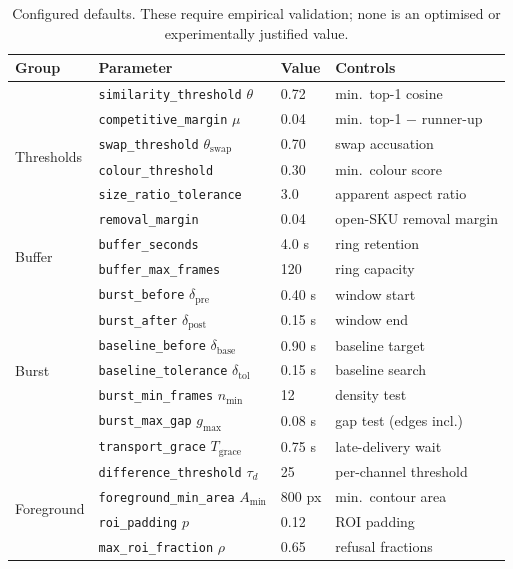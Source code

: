 \documentclass[conference]{IEEEtran}
\begin{document}
\begin{table}[!t]
\caption{Configured defaults. These require empirical validation; none is an optimised or
experimentally justified value.}
\label{tab:params}
\centering
\footnotesize
\renewcommand{\arraystretch}{1.1}
\begin{tabular}{@{}llll@{}}
\toprule
Group & Parameter & Value & Controls \\
\midrule
\multirow{6}{*}{Thresholds}
 & \texttt{similarity\_threshold} $\theta$ & 0.72 & min.\ top-1 cosine \\
 & \texttt{competitive\_margin} $\mu$ & 0.04 & min.\ top-1 $-$ runner-up \\
 & \texttt{swap\_threshold} $\theta_{\mathrm{swap}}$ & 0.70 & swap accusation \\
 & \texttt{colour\_threshold} & 0.30 & min.\ colour score \\
 & \texttt{size\_ratio\_tolerance} & 3.0 & apparent aspect ratio \\
 & \texttt{removal\_margin} & 0.04 & open-SKU removal margin \\
\midrule
\multirow{2}{*}{Buffer}
 & \texttt{buffer\_seconds} & 4.0 s & ring retention \\
 & \texttt{buffer\_max\_frames} & 120 & ring capacity \\
\midrule
\multirow{7}{*}{Burst}
 & \texttt{burst\_before} $\delta_{\mathrm{pre}}$ & 0.40 s & window start \\
 & \texttt{burst\_after} $\delta_{\mathrm{post}}$ & 0.15 s & window end \\
 & \texttt{baseline\_before} $\delta_{\mathrm{base}}$ & 0.90 s & baseline target \\
 & \texttt{baseline\_tolerance} $\delta_{\mathrm{tol}}$ & 0.15 s & baseline search \\
 & \texttt{burst\_min\_frames} $n_{\min}$ & 12 & density test \\
 & \texttt{burst\_max\_gap} $g_{\max}$ & 0.08 s & gap test (edges incl.) \\
 & \texttt{transport\_grace} $T_{\mathrm{grace}}$ & 0.75 s & late-delivery wait \\
\midrule
\multirow{4}{*}{Foreground}
 & \texttt{difference\_threshold} $\tau_d$ & 25 & per-channel threshold \\
 & \texttt{foreground\_min\_area} $A_{\min}$ & 800 px & min.\ contour area \\
 & \texttt{roi\_padding} $p$ & 0.12 & ROI padding \\
 & \texttt{max\_roi\_fraction} $\rho$ & 0.65 & refusal fractions \\

\end{tabular}
\end{table}
\end{document}
